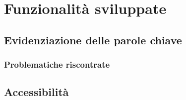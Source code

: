 \chapter{Funzionalità sviluppate}
\label{cap:funzionalità-sviluppate}

\section{Evidenziazione delle parole chiave}

\subsection{Problematiche riscontrate}

\section{Accessibilità}
